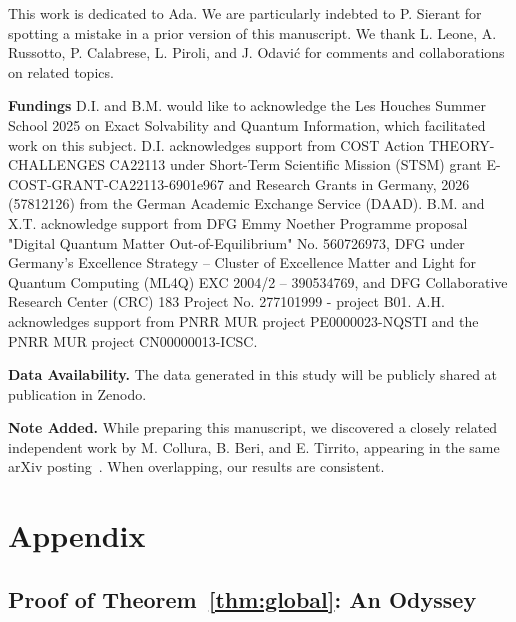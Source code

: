 \documentclass[prx,twocolumn,superscriptaddress,aps,10pt, frontmatterverbose, reprint,footinbib,longbibliography=true]{revtex4-2}
\begin{document}
\begin{acknowledgments}
This work is dedicated to Ada. We are particularly indebted to P. Sierant for spotting a mistake in a prior version of this manuscript. 
We thank L. Leone, A. Russotto, P. Calabrese, L. Piroli, and J. Odavić for comments and collaborations on related topics.

\textbf{Fundings}
D.I. and B.M. would like to acknowledge the Les Houches Summer School 2025 on Exact Solvability and Quantum Information, which facilitated work on this subject.
D.I. acknowledges support from COST Action THEORY-CHALLENGES CA22113 under Short-Term Scientific Mission (STSM) grant E-COST-GRANT-CA22113-6901e967 and Research Grants in Germany, 2026 (57812126) from the German Academic Exchange Service (DAAD).  
B.M. and X.T. acknowledge support from DFG Emmy Noether Programme proposal "Digital Quantum Matter Out-of-Equilibrium" No. 560726973, DFG under Germany's Excellence Strategy – Cluster of Excellence Matter and Light for Quantum Computing (ML4Q) EXC 2004/2 – 390534769, and DFG Collaborative Research Center (CRC) 183 Project No. 277101999 - project B01. 
A.H. acknowledges support from  PNRR MUR project PE0000023-NQSTI and the PNRR MUR project CN00000013-ICSC.

\textbf{Data Availability.} The data generated in this study will be publicly shared at publication in Zenodo.



\textbf{Note Added.}
While preparing this manuscript, we discovered a closely related independent work by M. Collura, B. Beri, and E. Tirrito, appearing in the same arXiv posting~\cite{collura2026nonlocalnonstabilizernessfreefermion}. 
When overlapping, our results are consistent.
\end{acknowledgments}
\clearpage

\section{Appendix}
\label{sec:Appendix}

\subsection{Proof of Theorem~\ref{thm:global}: An Odyssey %
}
\label{app:proof}
\end{document}
